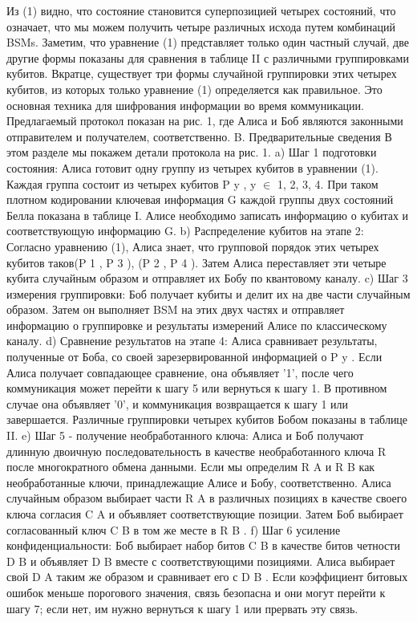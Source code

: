 Из (1) видно, что состояние становится суперпозицией четырех состояний, что означает, что мы можем получить четыре различных исхода путем комбинаций BSMs. Заметим, что уравнение (1) представляет только один частный случай, две другие формы показаны для сравнения в таблице II с различными группировками кубитов.
Вкратце, существует три формы случайной группировки этих четырех кубитов, из которых только уравнение (1) определяется как правильное. Это основная техника для шифрования информации во время коммуникации. Предлагаемый протокол показан на рис. 1, где Алиса и Боб являются законными отправителем и получателем, соответственно.
B. Предварительные сведения В этом разделе мы покажем детали протокола на рис. 1.
a) Шаг 1 подготовки состояния: Алиса готовит одну группу из четырех кубитов в уравнении (1). Каждая группа состоит из четырех кубитов P y , y $\in$ {1, 2, 3, 4}. При таком плотном кодировании ключевая информация G каждой группы двух состояний Белла показана в таблице I. Алисе необходимо записать информацию о кубитах и соответствующую информацию G.
b) Распределение кубитов на этапе 2: Согласно уравнению (1), Алиса знает, что групповой порядок этих четырех кубитов таков{(P 1 , P 3 ), (P 2 , P 4 )}. Затем Алиса переставляет эти четыре кубита случайным образом и отправляет их Бобу по квантовому каналу.
c) Шаг 3 измерения группировки: Боб получает кубиты и делит их на две части случайным образом. Затем он выполняет BSM на этих двух частях и отправляет информацию о группировке и результаты измерений Алисе по классическому каналу.
d) Сравнение результатов на этапе 4: Алиса сравнивает результаты, полученные от Боба, со своей зарезервированной информацией о P y . Если Алиса получает совпадающее сравнение, она объявляет '1', после чего коммуникация может перейти к шагу 5 или вернуться к шагу 1.
В противном случае она объявляет '0', и коммуникация возвращается к шагу 1 или завершается. Различные группировки четырех кубитов Бобом показаны в таблице II.
e) Шаг 5 - получение необработанного ключа: Алиса и Боб получают длинную двоичную последовательность в качестве необработанного ключа R после многократного обмена данными. Если мы определим R A и R B как необработанные ключи, принадлежащие Алисе и Бобу, соответственно. Алиса случайным образом выбирает части R A в различных позициях в качестве своего ключа согласия C A и объявляет соответствующие позиции. Затем Боб выбирает согласованный ключ C B в том же месте в R B .
f) Шаг 6 усиление конфиденциальности: Боб выбирает набор битов C B в качестве битов четности D B и объявляет D B вместе с соответствующими позициями. Алиса выбирает свой D A таким же образом и сравнивает его с D B . Если коэффициент битовых ошибок меньше порогового значения, связь безопасна и они могут перейти к шагу 7; если нет, им нужно вернуться к шагу 1 или прервать эту связь.

